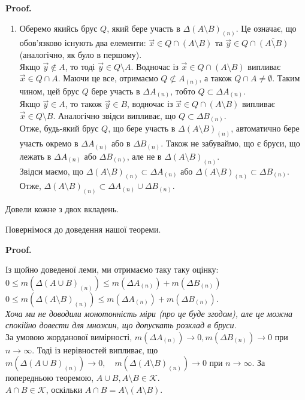 \documentclass[a4paper, 10pt]{article}
\makeatletter
\def\qed{$\blacksquare$}
\theoremstyle{theoremdd}
\theoremstyle{theoremdd}
\theoremstyle{theoremdd}
\theoremstyle{theoremdd}
\theoremstyle{theoremdd}
\theoremstyle{theoremdd}
\theoremstyle{theoremdd}
\theoremstyle{theoremdd}
\renewenvironment{proof}[1][Proof.\\]{\par
\pushQED{\hfill \qed}%
\normalfont \topsep6\p@\@plus6\p@\relax
\trivlist
\item\relax
{\bfseries
#1\@addpunct{.}}\hspace\labelsep\ignorespaces
}{%
\popQED\endtrivlist\@endpefalse
}
\makeatother
\begin{document}
\begin{proof}
\begin{enumerate}[wide=0pt,label={\arabic*)}]
\item Оберемо якийсь брус $Q$, який бере участь в $\Delta (A \setminus B)_{(n)}$. Це означає, що обов'язково існують два елементи: $\vec{x} \in Q \cap (A \setminus B)$ та $\vec{y} \in Q \cap \overline{(A \setminus B)}$ (аналогічно, як було в першому).\\
Якщо $\vec{y} \not\in A$, то тоді $\vec{y} \in Q \setminus A$. Водночас із $\vec{x} \in Q \cap (A \setminus B)$ випливає $\vec{x} \in Q \cap A$. Маючи це все, отримаємо $Q \not\subset A_{(n)}$, а також $Q \cap A \neq \emptyset$. Таким чином, цей брус $Q$ бере участь в $\Delta A_{(n)}$, тобто $Q \subset \Delta A_{(n)}$.\\
Якщо $\vec{y} \in A$, то також $\vec{y} \in B$, водночас із $\vec{x} \in Q \cap (A \setminus B)$ випливає $\vec{x} \in Q \setminus B$. Аналогічно звідси випливає, що $Q \subset \Delta B_{(n)}$.\\
Отже, будь-який брус $Q$, що бере участь в $\Delta (A \setminus B)_{(n)}$, автоматично бере участь окремо в $\Delta A_{(n)}$ або в $\Delta B_{(n)}$. Також не забуваймо, що є бруси, що лежать в $\Delta A_{(n)}$ або $\Delta B_{(n)}$, але не в $\Delta (A \setminus B)_{(n)}$.\\
Звідси маємо, що $\Delta (A \setminus B)_{(n)} \subset \Delta A_{(n)}$ або $\Delta (A \setminus B)_{(n)} \subset \Delta B_{(n)}$. Отже, $\Delta (A \setminus B)_{(n)} \subset \Delta A_{(n)} \cup \Delta B_{(n)}$.
\end{enumerate}
Довели кожне з двох вкладень.
\end{proof}

Повернімося до доведення нашої теореми.

\begin{proof}
Із щойно доведеної леми, ми отримаємо таку таку оцінку:\\
$0 \leq m(\Delta (A \cup B)_{(n)}) \leq m(\Delta A_{(n)}) + m(\Delta B_{(n)})$\\
$0 \leq m(\Delta (A \setminus B)_{(n)}) \leq m(\Delta A_{(n)}) + m(\Delta B_{(n)})$.\\
\textit{Хоча ми не доводили монотонність міри (про це буде згодом), але це можна спокійно довести для множин, що допускать розклад в бруси.}\\
За умовою жорданової вимірності, $m(\Delta A_{(n)}) \to 0, m(\Delta B_{(n)}) \to 0$ при $n \to \infty$. Тоді із нерівностей випливає, що $m(\Delta (A \cup B)_{(n)}) \to 0, \quad m(\Delta (A \setminus B)_{(n)}) \to 0$ при $n \to \infty$. За попередньою теоремою, $A \cup B, A \setminus B \in \mathcal{K}$.\\
$A \cap B \in \mathcal{K}$, оскільки $A \cap B = A \setminus (A \setminus B)$.
\end{proof}
\end{document}

